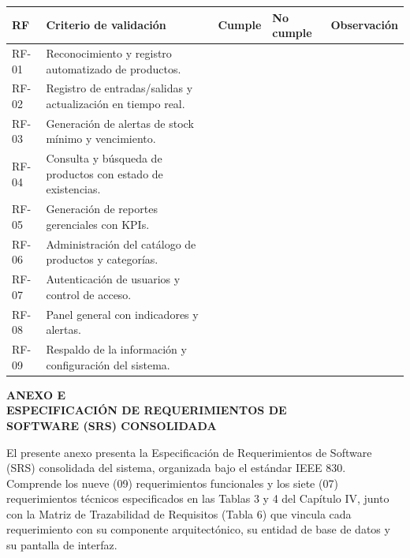 \documentclass[12pt, letterpaper]{report}
\begin{document}
\begingroup
\small
\setlength{\tabcolsep}{3pt}
\noindent
\begin{tabular}{|>{\centering\arraybackslash}p{1.1cm}|>{\raggedright\arraybackslash}p{6.6cm}|>{\centering\arraybackslash}p{1.4cm}|>{\centering\arraybackslash}p{1.7cm}|>{\raggedright\arraybackslash}p{2.2cm}|}
\hline
\textbf{RF} & \textbf{Criterio de validación} & \textbf{Cumple} & \textbf{No cumple} & \textbf{Observación} \\
\hline
RF-01 & Reconocimiento y registro automatizado de productos. & & & \\
\hline
RF-02 & Registro de entradas/salidas y actualización en tiempo real. & & & \\
\hline
RF-03 & Generación de alertas de stock mínimo y vencimiento. & & & \\
\hline
RF-04 & Consulta y búsqueda de productos con estado de existencias. & & & \\
\hline
RF-05 & Generación de reportes gerenciales con KPIs. & & & \\
\hline
RF-06 & Administración del catálogo de productos y categorías. & & & \\
\hline
RF-07 & Autenticación de usuarios y control de acceso. & & & \\
\hline
RF-08 & Panel general con indicadores y alertas. & & & \\
\hline
RF-09 & Respaldo de la información y configuración del sistema. & & & \\
\hline
\end{tabular}
\endgroup
{}

\clearpage
\begin{center}
{\fontsize{14}{16}\selectfont\bfseries
ANEXO E\\
ESPECIFICACIÓN DE REQUERIMIENTOS DE\\
SOFTWARE (SRS) CONSOLIDADA\par}
\end{center}
\vspace{12pt}

El presente anexo presenta la Especificación de Requerimientos de
Software (SRS) consolidada del sistema, organizada bajo el estándar
IEEE 830. Comprende los nueve (09) requerimientos funcionales y los
siete (07) requerimientos técnicos especificados en las Tablas 3 y 4
del Capítulo IV, junto con la Matriz de Trazabilidad de Requisitos
(Tabla 6) que vincula cada requerimiento con su componente
arquitectónico, su entidad de base de datos y su pantalla de
interfaz.
\end{document}
